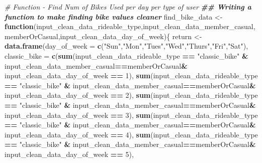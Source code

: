 \documentclass[
]{article}
\newenvironment{Shaded}{\begin{snugshade}}{\end{snugshade}}
\newcommand{\AttributeTok}[1]{\textcolor[rgb]{0.13,0.29,0.53}{#1}}
\newcommand{\CommentTok}[1]{\textcolor[rgb]{0.56,0.35,0.01}{\textit{#1}}}
\newcommand{\ControlFlowTok}[1]{\textcolor[rgb]{0.13,0.29,0.53}{\textbf{#1}}}
\newcommand{\DecValTok}[1]{\textcolor[rgb]{0.00,0.00,0.81}{#1}}
\newcommand{\DocumentationTok}[1]{\textcolor[rgb]{0.56,0.35,0.01}{\textbf{\textit{#1}}}}
\newcommand{\FunctionTok}[1]{\textcolor[rgb]{0.13,0.29,0.53}{\textbf{#1}}}
\newcommand{\NormalTok}[1]{#1}
\newcommand{\OtherTok}[1]{\textcolor[rgb]{0.56,0.35,0.01}{#1}}
\newcommand{\SpecialCharTok}[1]{\textcolor[rgb]{0.81,0.36,0.00}{\textbf{#1}}}
\newcommand{\StringTok}[1]{\textcolor[rgb]{0.31,0.60,0.02}{#1}}
\begin{document}
\begin{Shaded}
\begin{Highlighting}[]
\CommentTok{\# Function {-} Find Num of Bikes Used per day per type of user}
\DocumentationTok{\#\# Writing a function to make finding bike values cleaner}
\NormalTok{find\_bike\_data }\OtherTok{\textless{}{-}} \ControlFlowTok{function}\NormalTok{(input\_clean\_data\_rideable\_type,input\_clean\_data\_member\_casual,memberOrCasual,input\_clean\_data\_day\_of\_week)\{}
\NormalTok{  return }\OtherTok{\textless{}{-}} \FunctionTok{data.frame}\NormalTok{(}\AttributeTok{day\_of\_week =} \FunctionTok{c}\NormalTok{(}\StringTok{"Sun"}\NormalTok{,}\StringTok{"Mon"}\NormalTok{,}\StringTok{"Tues"}\NormalTok{,}\StringTok{"Wed"}\NormalTok{,}\StringTok{"Thurs"}\NormalTok{,}\StringTok{"Fri"}\NormalTok{,}\StringTok{"Sat"}\NormalTok{),}
                       \AttributeTok{classic\_bike =} \FunctionTok{c}\NormalTok{(}\FunctionTok{sum}\NormalTok{(input\_clean\_data\_rideable\_type }\SpecialCharTok{==} \StringTok{"classic\_bike"} \SpecialCharTok{\&}\NormalTok{ input\_clean\_data\_member\_casual}\SpecialCharTok{==}\NormalTok{memberOrCasual}\SpecialCharTok{\&}\NormalTok{ input\_clean\_data\_day\_of\_week }\SpecialCharTok{==} \DecValTok{1}\NormalTok{),}
                                        \FunctionTok{sum}\NormalTok{(input\_clean\_data\_rideable\_type }\SpecialCharTok{==} \StringTok{"classic\_bike"} \SpecialCharTok{\&}\NormalTok{ input\_clean\_data\_member\_casual}\SpecialCharTok{==}\NormalTok{memberOrCasual}\SpecialCharTok{\&}\NormalTok{ input\_clean\_data\_day\_of\_week }\SpecialCharTok{==} \DecValTok{2}\NormalTok{),}
                                        \FunctionTok{sum}\NormalTok{(input\_clean\_data\_rideable\_type }\SpecialCharTok{==} \StringTok{"classic\_bike"} \SpecialCharTok{\&}\NormalTok{ input\_clean\_data\_member\_casual}\SpecialCharTok{==}\NormalTok{memberOrCasual}\SpecialCharTok{\&}\NormalTok{ input\_clean\_data\_day\_of\_week }\SpecialCharTok{==} \DecValTok{3}\NormalTok{),}
                                        \FunctionTok{sum}\NormalTok{(input\_clean\_data\_rideable\_type }\SpecialCharTok{==} \StringTok{"classic\_bike"} \SpecialCharTok{\&}\NormalTok{ input\_clean\_data\_member\_casual}\SpecialCharTok{==}\NormalTok{memberOrCasual}\SpecialCharTok{\&}\NormalTok{ input\_clean\_data\_day\_of\_week }\SpecialCharTok{==} \DecValTok{4}\NormalTok{),}
                                        \FunctionTok{sum}\NormalTok{(input\_clean\_data\_rideable\_type }\SpecialCharTok{==} \StringTok{"classic\_bike"} \SpecialCharTok{\&}\NormalTok{ input\_clean\_data\_member\_casual}\SpecialCharTok{==}\NormalTok{memberOrCasual}\SpecialCharTok{\&}\NormalTok{ input\_clean\_data\_day\_of\_week }\SpecialCharTok{==} \DecValTok{5}\NormalTok{),}

\end{Highlighting}
\end{Shaded}
\end{document}
